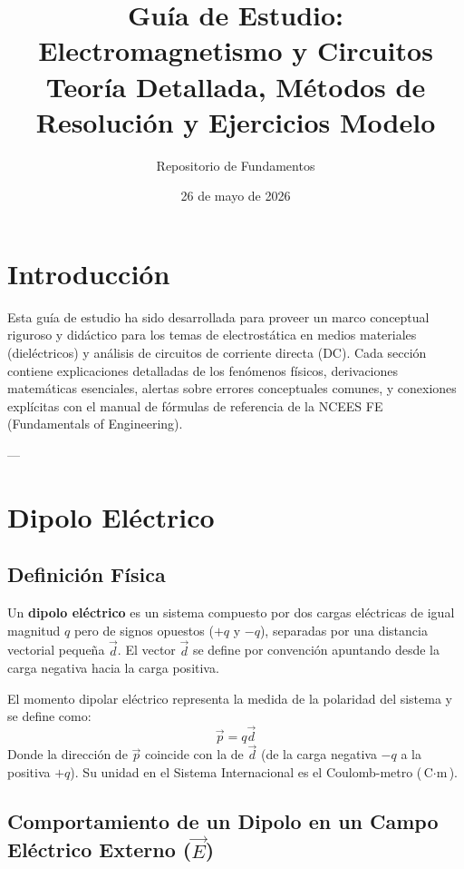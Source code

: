\documentclass[12pt, a4paper]{article}
\title{
    \Huge\bfseries\color{sectioncolor}
    Guía de Estudio: Electromagnetismo y Circuitos\\[0.3cm]
    \large\color{black!70} Teoría Detallada, Métodos de Resolución y Ejercicios Modelo
}
\author{Repositorio de Fundamentos}
\date{26 de mayo de 2026}
\begin{document}
\maketitle
\thispagestyle{empty}
\newpage

\tableofcontents
\newpage

\section{Introducción}

Esta guía de estudio ha sido desarrollada para proveer un marco conceptual riguroso y didáctico para los temas de electrostática en medios materiales (dieléctricos) y análisis de circuitos de corriente directa (DC). Cada sección contiene explicaciones detalladas de los fenómenos físicos, derivaciones matemáticas esenciales, alertas sobre errores conceptuales comunes, y conexiones explícitas con el manual de fórmulas de referencia de la NCEES FE (Fundamentals of Engineering).

---

\section{Dipolo Eléctrico}

\subsection{Definición Física}
Un \textbf{dipolo eléctrico} es un sistema compuesto por dos cargas eléctricas de igual magnitud $q$ pero de signos opuestos ($+q$ y $-q$), separadas por una distancia vectorial pequeña $\vec{d}$. El vector $\vec{d}$ se define por convención apuntando desde la carga negativa hacia la carga positiva.

\begin{definicion}
El momento dipolar eléctrico representa la medida de la polaridad del sistema y se define como:
\begin{equation}
    \vec{p} = q \vec{d}
\end{equation}
Donde la dirección de $\vec{p}$ coincide con la de $\vec{d}$ (de la carga negativa $-q$ a la positiva $+q$). Su unidad en el Sistema Internacional es el Coulomb-metro ($\text{C}\cdot\text{m}$).
\end{definicion}

\subsection{Comportamiento de un Dipolo en un Campo Eléctrico Externo ($\vec{E}$)}
\end{document}
